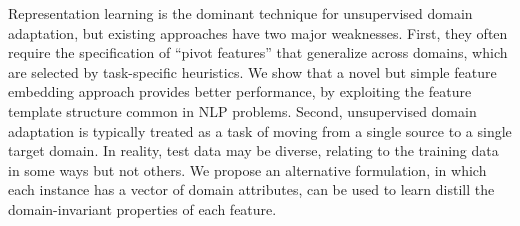 Representation learning is the dominant technique for unsupervised domain adaptation, but existing approaches have two major weaknesses. First, they often require the specification of ``pivot features'' that generalize across domains, which are selected by task-specific heuristics. We show that a novel but simple feature embedding approach provides better performance, by exploiting the feature template structure common in NLP problems. Second, unsupervised domain adaptation is typically treated as a task of moving from a single source to a single target domain. In reality, test data may be diverse, relating to the training data in some ways but not others. We propose an alternative formulation, in which each instance has a vector of domain attributes, can be used to learn distill the domain-invariant properties of each feature.
